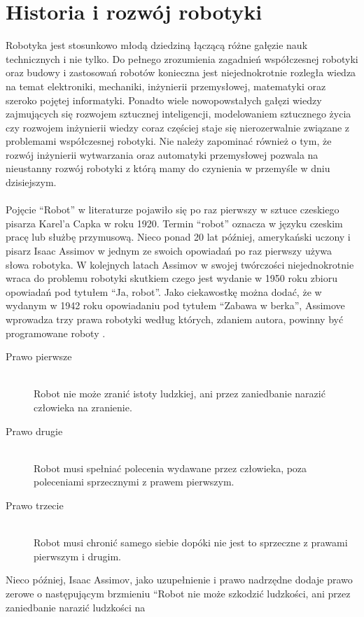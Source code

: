 \section{Historia i rozwój robotyki}
Robotyka jest stosunkowo młodą dziedziną łączącą różne gałęzie nauk
technicznych i nie tylko. Do pełnego zrozumienia zagadnień współczesnej robotyki
oraz budowy i zastosowań robotów konieczna jest niejednokrotnie rozległa wiedza
na temat elektroniki, mechaniki, inżynierii przemysłowej, matematyki oraz
szeroko pojętej informatyki. Ponadto wiele nowopowstałych gałęzi wiedzy
zajmujących się rozwojem sztucznej inteligencji, modelowaniem sztucznego życia czy rozwojem
inżynierii wiedzy coraz częściej staje się nierozerwalnie związane z problemami
współczesnej robotyki. Nie należy zapominać również o tym, że rozwój inżynierii
wytwarzania oraz automatyki przemysłowej pozwala na nieustanny rozwój robotyki z
którą mamy do czynienia w przemyśle w dniu dzisiejszym.\\
\\
Pojęcie ``Robot'' w literaturze pojawiło się po raz pierwszy w sztuce czeskiego
pisarza Karel'a Capka w roku 1920. Termin ``robot'' oznacza w języku czeskim
pracę lub służbę przymusową. Nieco ponad 20 lat później, amerykański uczony i
pisarz Isaac Assimov w jednym ze swoich opowiadań po raz pierwszy używa słowa
robotyka. W kolejnych latach Assimov w swojej twórczości niejednokrotnie wraca
do problemu robotyki skutkiem czego jest wydanie w 1950 roku zbioru opowiadań
pod tytułem ``Ja, robot''. Jako ciekawostkę można dodać, że w wydanym w 1942
roku opowiadaniu pod tytułem ``Zabawa w berka'', Assimove wprowadza trzy prawa
robotyki według których, zdaniem autora, powinny być programowane roboty \cite{Runaround}.
\begin{description}
\item[Prawo pierwsze] \hfill \\
Robot nie może zranić istoty ludzkiej, ani przez zaniedbanie narazić człowieka
na zranienie. 
\item[Prawo drugie] \hfill \\
Robot musi spełniać polecenia wydawane przez człowieka, poza poleceniami
sprzecznymi z prawem pierwszym.
\item[Prawo trzecie] \hfill \\
Robot musi chronić samego siebie dopóki nie jest to sprzeczne z prawami
pierwszym i drugim.
\end{description} 
Nieco później, Isaac Assimov, jako uzupełnienie i prawo nadrzędne dodaje prawo
zerowe o następującym brzmieniu ``Robot nie może szkodzić ludzkości, ani przez zaniedbanie narazić ludzkości na
